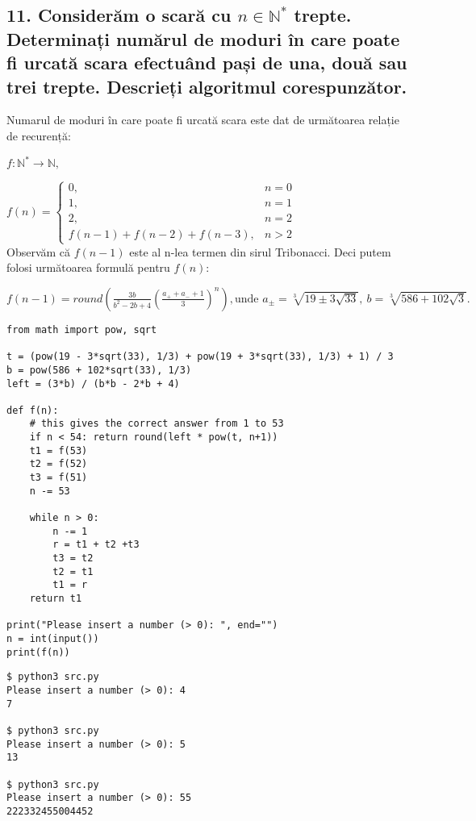 \documentclass[11pt]{article}
\begin{document}
\begin{itemize}
\subsection*{11. Considerăm o scară cu \(n \in \mathbb{N}^*\) trepte. Determinați numărul de moduri în care poate fi urcată scara efectuând pași de una, două sau trei trepte. Descrieți algoritmul corespunzător.}
\label{sec:orgf7557e3}

Numarul de moduri în care poate fi urcată scara este dat de următoarea relație de recurență:

$f : \mathbb{N}^* \to \mathbb{N},$

$
f(n) = 
\begin{cases}
0, & n = 0\\
1, & n = 1\\
2, & n = 2\\
f(n-1)+f(n-2)+f(n-3), & n > 2
\end{cases}
$\\
Observăm că $f(n-1)$ este al n-lea termen din sirul Tribonacci. Deci putem folosi următoarea formulă pentru $f(n)$:

$
f(n - 1) = \mathit{round} \left( 
   \frac{3b} {b^2-2b+4}
   \left(
   \frac{a_++a_-+1}{3}
   \right)^n
  \right),
\text{unde } a_{\pm} = \sqrt[3]{19 \pm 3 \sqrt{33}},\ b = \sqrt[3]{586+102\sqrt{3}}.
$

\begin{verbatim}
from math import pow, sqrt

t = (pow(19 - 3*sqrt(33), 1/3) + pow(19 + 3*sqrt(33), 1/3) + 1) / 3
b = pow(586 + 102*sqrt(33), 1/3)
left = (3*b) / (b*b - 2*b + 4)

def f(n):
    # this gives the correct answer from 1 to 53
    if n < 54: return round(left * pow(t, n+1))
    t1 = f(53)
    t2 = f(52)
    t3 = f(51)
    n -= 53

    while n > 0:
        n -= 1
        r = t1 + t2 +t3
        t3 = t2
        t2 = t1
        t1 = r
    return t1

print("Please insert a number (> 0): ", end="")
n = int(input())
print(f(n))
\end{verbatim}

\begin{verbatim}
$ python3 src.py
Please insert a number (> 0): 4
7

$ python3 src.py
Please insert a number (> 0): 5
13

$ python3 src.py
Please insert a number (> 0): 55
222332455004452
\end{verbatim}


\end{itemize}
\end{document}
